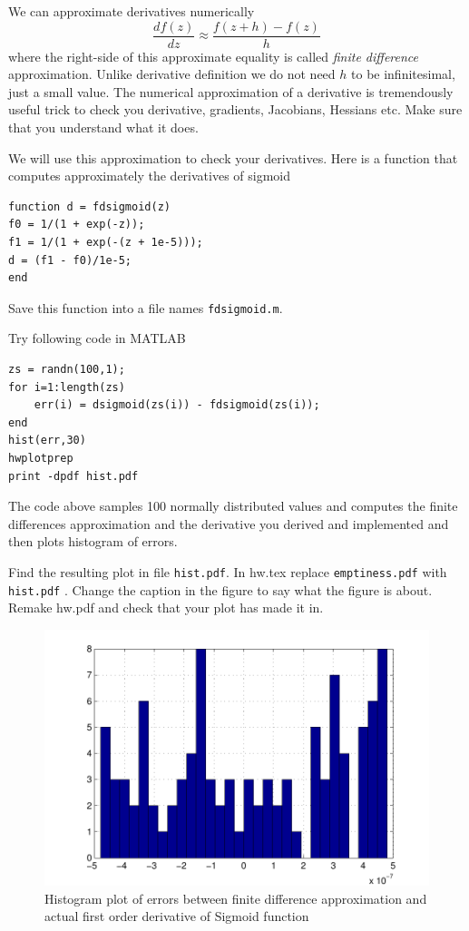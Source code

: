 \documentclass{article}
\begin{document}
\newproblem{1pt}
We can approximate derivatives numerically
\[
\frac{df(z)}{dz}\approx \frac{f(z+h) - f(z)}{h}
\]
where the right-side of this approximate equality is called {\em finite difference} approximation. Unlike derivative definition we do not need $h$ to be infinitesimal, just a small value. The numerical approximation of a derivative is tremendously useful trick to check you derivative, gradients, Jacobians, Hessians etc. Make sure that you understand what it does.

We will use this approximation to check your derivatives. Here is a function that computes approximately the derivatives of sigmoid
\begin{verbatim}
function d = fdsigmoid(z)
f0 = 1/(1 + exp(-z));
f1 = 1/(1 + exp(-(z + 1e-5)));
d = (f1 - f0)/1e-5;
end
\end{verbatim}
Save this function into a file names \texttt{fdsigmoid.m}.

Try following code in MATLAB
\begin{verbatim}
zs = randn(100,1);
for i=1:length(zs)
    err(i) = dsigmoid(zs(i)) - fdsigmoid(zs(i));
end
hist(err,30)
hwplotprep
print -dpdf hist.pdf
\end{verbatim}
The code above samples 100 normally distributed values and computes the finite differences approximation and the derivative you derived and implemented and then plots histogram of errors.

Find the resulting plot in file {\tt hist.pdf}. In hw\theHW.tex replace {\tt emptiness.pdf} with {\tt hist.pdf} . Change the
caption in the figure to say what the figure is about. Remake hw\theHW.pdf and check that your plot has made it in.
\begin{figure}[H]
\begin{center}
\includegraphics[scale=0.5]{hist_perma.pdf}
\caption{Histogram plot of errors between finite difference approximation and actual first order derivative of Sigmoid function}
\end{center}
\end{figure}
\end{document}
